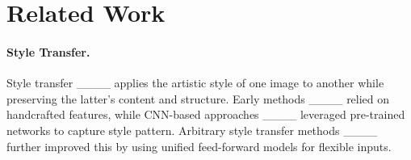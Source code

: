 \section{Related Work}
\paragraph{\textbf{Style Transfer.}}



Style transfer ____ applies the artistic style of one image to another while preserving the latter's content and structure. Early methods ____ relied on handcrafted features, while CNN-based approaches ____ leveraged pre-trained networks to capture style pattern. Arbitrary style transfer methods ____ further improved this by using unified feed-forward models for flexible inputs.




